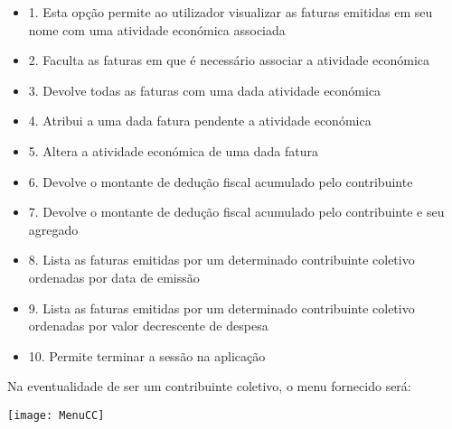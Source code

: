 \documentclass[10pt,a4paper]{article}
\begin{document}
\begin{itemize}
 \item 1. Esta opção permite ao utilizador visualizar as faturas emitidas em seu nome com uma atividade económica associada
 \item 2. Faculta as faturas em que é necessário associar a atividade económica
 \item 3. Devolve todas as faturas com uma dada atividade económica
 \item 4. Atribui a uma dada fatura pendente a atividade económica
 \item 5. Altera a atividade económica de uma dada fatura
 \item 6. Devolve o montante de dedução fiscal acumulado pelo contribuinte
 \item 7. Devolve o montante de dedução fiscal acumulado pelo contribuinte e seu agregado
 \item 8. Lista as faturas emitidas por um determinado contribuinte coletivo ordenadas por data de emissão
 \item 9. Lista as faturas emitidas por um determinado contribuinte coletivo ordenadas por valor decrescente de despesa
 \item 10. Permite terminar a sessão na aplicação
\end{itemize}

Na eventualidade de ser um contribuinte coletivo, o menu fornecido será:

\begin{center}
\graphicspath{ {/home/jessica/Desktop/} }
\texttt{[image: MenuCC]}\\
\end{center}
\end{document}

